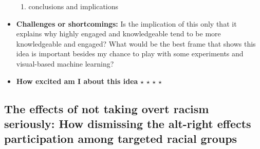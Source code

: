 \documentclass[12pt]{article}
\begin{document}
\begin{itemize}
\begin{enumerate}
            \item conclusions and implications
        \end{enumerate}
        \item \textbf{Challenges or shortcomings:} Is the implication of this only that it explains why highly engaged and knowledgeable tend to be more knowledgeable and engaged? What would be the best frame that shows this idea is important besides my chance to play with some experiments and visual-based machine learning?
        \item \textbf{How excited am I about this idea} $\star$ $\star$ $\star$ $\star$
    \end{itemize}
\subsection{The effects of not taking overt racism seriously: How dismissing the alt-right effects participation among targeted racial groups}
\end{document}
